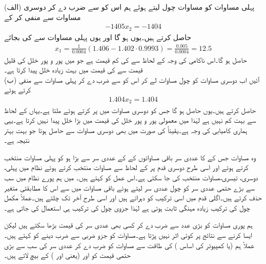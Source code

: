 (الف)  پہلی مساوات کو مساوات چول لیتے ہوئے ہم اس کو  سے ضرب دے کر دوسری مساوات سے منفی کر کے
\begin{align*}
-1405x_2=-1404
\end{align*}
حاصل کرتے ہیں۔یوں  ہو گا اور یوں پہلی مساوات سے  کی بجائے 
\begin{align*}
x_1=\frac{1}{0.0004}(1.406-1.402\cdot 0.9993)=\frac{0.005}{0.0004}=12.5
\end{align*}
حاصل ہو گا۔اس ناکامی کی وجہ  کے لحاظ سے   کی کم قیمت ہے جو  میں پور و پور خلل کی قلیل قیمت سے  کی قیمت میں بہت زیادہ خلل پیدا کرتا ہے۔\\
(ب) آئیں اب دوسری مساوات کو چول مساوات لے کر اس کو  سے ضرب دے کر پہلی مساوات سے منفی کرتے ہوئے
\begin{align*}
1.404x_2=1.404
\end{align*}
حاصل کرتے ہیں۔یوں  حاصل ہو گا جس کو دوسری مساوات میں پر کرتے ہوئے  ملتا ہے۔یہاں  کے لحاظ سے  بہت کم نہیں ہے لہٰذا  میں معمولی پور و پور خلل  کی قیمت میں بڑا خلل پیدا نہیں کرتا ہے۔یہی ہماری کامیابی کی  وجہ ہے۔یقیناً  کی صورت میں بھی دوسری مساوات سے  حاصل ہوتا جو بہت بہتر نتیجہ  ہے۔

وہ مساوات جس کے  کا عددی سر باقی مساواتوں کے  کے عددی سر سے بڑا ہو کو پہلی مساوات منتخب کرتے ہوئے اور اسی طرح دوسری قدم پر  کے لحاظ سے مساوات منتخب کرتے ہوئے نظام میں پہلی، دوسری، تیسری، مساوات منتخب کی جا سکتی ہے۔اس عمل کو  کہتے ہیں۔  میں ہم  پورے نظام میں سب سے بڑے حتمی عددی سر کو چول عددی سر لیتے ہوئے باقی مساوات میں سے اس کا مطابقتی متغیر حذف کرتے ہیں۔اگلی قدم میں اسی ترکیب کو دہراتے ہیں اور اسی طرح آخر تک چلتے ہیں۔عملاً مکمل چول کی ترکیب زیادہ مہنگی ثابت ہوتی ہے لہٰذا جزوی چول کی ترکیب ہی استعمال کی جاتی ہے۔

ہم پوری مساوات کو بڑی عدد سے ضرب دے کر کسی بھی عددی سر کی قیمت بڑھا سکتے ہیں لیکن ایسا کرنے سے نتائج پر کوئی اثر نہیں پڑتا ہے۔مساوات کو جزو ضربی سے ضرب دینے کو   کہتے ہیں۔عملاً ہم  (یا کمپیوٹر کی اساس ) کی طاقت سے مساوات کو ضرب دے کر عددی سر کی سب سے بڑی حتمی قیمت کو  اور  (یعنی  اور ) کے بیچ لاتے ہیں۔

